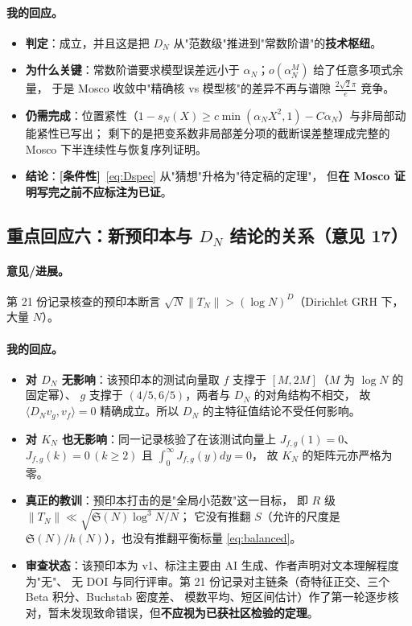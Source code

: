 \documentclass[11pt,a4paper]{ctexart}
\newcommand{\al}{\alpha_{N}}
\newcommand{\COND}{\textcolor{orange!85!black}{\textbf{[条件性]}}}
\begin{document}
\paragraph{我的回应。}
\begin{itemize}
\item \textbf{判定}：成立，并且这是把 $D_N$ 从"范数级"推进到"常数阶谱"的\textbf{技术枢纽}。
\item \textbf{为什么关键}：常数阶谱要求模型误差远小于 $\al$；$o(\al^M)$ 给了任意多项式余量，
于是 Mosco 收敛中"精确核 vs 模型核"的差异不再与谱隙 $\frac{2\sqrt2\pi}{e}$ 竞争。
\item \textbf{仍需完成}：位置紧性（$1-s_N(X)\ge c\min(\al X^2,1)-C\al$）与非局部动能紧性已写出；
剩下的是把变系数非局部差分项的截断误差整理成完整的 Mosco 下半连续性与恢复序列证明。
\item \textbf{结论}：\COND\ \eqref{eq:Dspec} 从"猜想"升格为"待定稿的定理"，
但\textbf{在 Mosco 证明写完之前不应标注为已证}。
\end{itemize}

\subsection{重点回应六：新预印本与 $D_N$ 结论的关系（意见 17）}

\paragraph{意见/进展。}
第 21 份记录核查的预印本断言 $\sqrt N\|T_N\|>(\log N)^D$（Dirichlet GRH 下，大量 $N$）。

\paragraph{我的回应。}
\begin{itemize}
\item \textbf{对 $D_N$ 无影响}：该预印本的测试向量取 $f$ 支撑于 $[M,2M]$（$M$ 为 $\log N$ 的固定幂）、
$g$ 支撑于 $(4/5,6/5)$，两者与 $D_N$ 的对角结构不相交，
故 $\langle D_Nv_g,v_f\rangle=0$ 精确成立。所以 $D_N$ 的主特征值结论不受任何影响。
\item \textbf{对 $K_N$ 也无影响}：同一记录核验了在该测试向量上
$J_{f,g}(1)=0$、$J_{f,g}(k)=0\,(k\ge2)$ 且 $\int_0^\infty J_{f,g}(y)dy=0$，
故 $K_N$ 的矩阵元亦严格为零。
\item \textbf{真正的教训}：预印本打击的是"全局小范数"这一目标，
即 $R$ 级 $\|T_N\|\ll\sqrt{\mathfrak S(N)\log^3N/N}$；
它没有推翻 $S$（允许的尺度是 $\mathfrak S(N)/h(N)$），也没有推翻平衡标量 \eqref{eq:balanced}。
\item \textbf{审查状态}：该预印本为 v1、标注主要由 AI 生成、作者声明对文本理解程度为"无"、
无 DOI 与同行评审。第 21 份记录对主链条（奇特征正交、三个 Beta 积分、Buchstab 密度差、
模数平均、短区间估计）作了第一轮逐步核对，暂未发现致命错误，但\textbf{不应视为已获社区检验的定理}。
\end{itemize}
\end{document}
